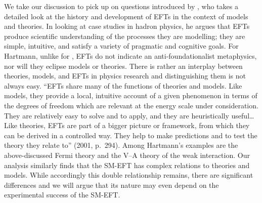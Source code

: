 We take our discussion to pick up on questions introduced by \citet{hartmann2001}, who takes a detailed look at the history and development of EFTs in the context of models and theories. 
In looking at case studies in hadron physics, he argues that EFTs produce scientific understanding of the processes they are modelling; they are simple, intuitive, and satisfy a variety of pragmatic and cognitive goals. 
For Hartmann, unlike for \citet{cao1993}, EFTs do not indicate an anti-foundationalist metaphysics, nor will they eclipse models or theories. There is rather an interplay between theories, models, and EFTs in physics research and distinguishing them is not always easy. 
``EFTs share many of the functions of theories and models. Like models, they provide a local, intuitive account of a given phenomenon in terms of the degrees of freedom which are relevant at the energy scale under consideration. They are relatively easy to solve and to apply, and they are heuristically useful\ldots Like theories, EFTs are part of a bigger picture or framework, from which they can be derived in a controlled way. They help to make predictions and to test the theory they relate to'' (2001, p.~294). 
Among Hartmann's examples are the above-discussed Fermi theory and the V--A theory of the weak interaction. 
Our analysis similarly finds that the SM-EFT has complex relations to theories and models. 
While accordingly this double relationship remains, there are significant differences and we will argue that its nature may even depend on the experimental success of the SM-EFT.


